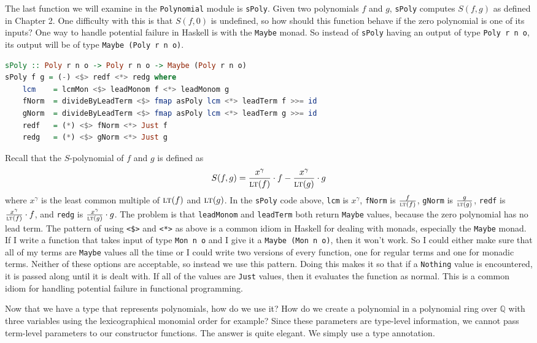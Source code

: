 \documentclass[MS, xcolor=dvipsnames]{wfuthesis}
\def\bQ{\mathbb{Q}}
\newcommand{\LT}{\ensuremath{\text{\sc lt}}}
\theoremstyle{definition}
\begin{document}
The last function we will examine in the \lstinline{Polynomial} module is \lstinline{sPoly}. Given two polynomials $f$ and $g$, \lstinline{sPoly} computes $S(f,g)$ as defined in Chapter 2. One difficulty with this is that $S(f,0)$ is undefined, so how should this function behave if the zero polynomial is one of its inputs? One way to handle potential failure in Haskell is with the \lstinline{Maybe} monad. So instead of \lstinline{sPoly} having an output of type \lstinline{Poly r n o}, its output will be of type \lstinline{Maybe (Poly r n o)}.
\begin{lstlisting}[language=Haskell]
sPoly :: Poly r n o -> Poly r n o -> Maybe (Poly r n o)
sPoly f g = (-) <$> redf <*> redg where
    lcm    = lcmMon <$> leadMonom f <*> leadMonom g
    fNorm  = divideByLeadTerm <$> fmap asPoly lcm <*> leadTerm f >>= id
    gNorm  = divideByLeadTerm <$> fmap asPoly lcm <*> leadTerm g >>= id
    redf   = (*) <$> fNorm <*> Just f
    redg   = (*) <$> gNorm <*> Just g
\end{lstlisting}
Recall that the $S$-polynomial of $f$ and $g$ is defined as
\[ S(f,g) = \frac{x^\gamma}{\LT(f)} \cdot f - \frac{x^\gamma}{\LT(g)} \cdot g \]
where $x^\gamma$ is the least common multiple of $\LT(f)$ and $\LT(g)$. In the \lstinline{sPoly} code above, \lstinline{lcm} is $x^\gamma$, \lstinline{fNorm} is $\frac{f}{\LT(f)}$, \lstinline{gNorm} is $\frac{g}{\LT(g)}$, \lstinline{redf} is $\frac{x^\gamma}{\LT(f)} \cdot f$, and \lstinline{redg} is $\frac{x^\gamma}{\LT(g)} \cdot g$. The problem is that \lstinline{leadMonom} and \lstinline{leadTerm} both return \lstinline{Maybe} values, because the zero polynomial has no lead term. The pattern of using \lstinline{<$>} and \lstinline{<*>} as above is a common idiom in Haskell for dealing with monads, especially the \lstinline{Maybe} monad. If I write a function that takes input of type \lstinline{Mon n o} and I give it a \lstinline{Maybe (Mon n o)}, then it won't work. So I could either make sure that all of my terms are \lstinline{Maybe} values all the time or I could write two versions of every function, one for regular terms and one for monadic terms. Neither of these options are acceptable, so instead we use this pattern. Doing this makes it so that if a \lstinline{Nothing} value is encountered, it is passed along until it is dealt with. If all of the values are \lstinline{Just} values, then it evaluates the function as normal. This is a common idiom for handling potential failure in functional programming. \par
Now that we have a type that represents polynomials, how do we use it? How do we create a polynomial in a polynomial ring over $\bQ$ with three variables using the lexicographical monomial order for example? Since these parameters are type-level information, we cannot pass term-level parameters to our constructor functions. The answer is quite elegant. We simply use a type annotation.
\end{document}
